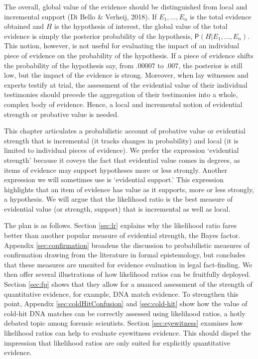 \documentclass[
  10pt,
  dvipsnames,enabledeprecatedfontcommands]{scrartcl}
\newcommand{\pr}[1]{\mathsf{P}(#1)}
\begin{document}
The overall, global value of the evidence should be distinguished from
local and incremental support (Di Bello \& Verheij, 2018). If
\(E_1, \dots, E_n\) is the total evidence obtained and \(H\) is the
hypothesis of interest, the global value of the total evidence is simply
the posterior probability of the hypothesis,
\(\pr{H \vert E_1, \dots, E_n}\). This notion, however, is not useful
for evaluating the impact of an individual piece of evidence on the
probability of the hypothesis. If a piece of evidence shifts the
probability of the hypothesis say, from \(.00007\) to \(.007\), the
posterior is still low, but the impact of the evidence is strong.
Moreover, when lay witnesses and experts testify at trial, the
assessment of the evidential value of their individual testimonies
should precede the aggregation of their testimonies into a whole,
complex body of evidence. Hence, a local and incremental notion of
evidential strength or probative value is needed.

This chapter articulates a probabilistic account of probative value or
evidential strength that is incremental (it tracks changes in
probability) and local (it is limited to individual pieces of evidence).
We prefer the expression `evidential strength' because it coveys the
fact that evidential value comes in degrees, as items of evidence may
support hypotheses more or less strongly. Another expression we will
sometimes use is `evidential support.' This expression highlights that
an item of evidence has value as it supports, more or less strongly, a
hypothesis. We will argue that the likelihood ratio is the best measure
of evidential value (or strength, support) that is incremental as well
as local.

The plan is as follows. Section \ref{sec:lr} explains why the likelihood
ratio fares better than another popular measure of evidential strength,
the Bayes factor. Appendix \ref{sec:confirmation} broadens the
discussion to probabilistic measures of confirmation drawing from the
literature in formal epistemology, but concludes that these measures are
unsuited for evidence evaluation in legal fact-finding. We then offer
several illustrations of how likelihood ratios can be fruitfully
deployed. Section \ref{sec:fp} shows that they allow for a nuanced
assessment of the strength of quantitative evidence, for example, DNA
match evidence. To strengthen this point, Appendix
\ref{sec:coldHitConfusion} and \ref{sec:cold-hit} show how the value of
cold-hit DNA matches can be correctly assessed using likelihood ratios,
a hotly debated topic among forensic scientists. Section
\ref{sec:eyewitness} examines how likelihood ratios can help to evaluate
eyewitness evidence. This should dispel the impression that likelihood
ratios are only suited for explicitly quantitative evidence.
\end{document}
